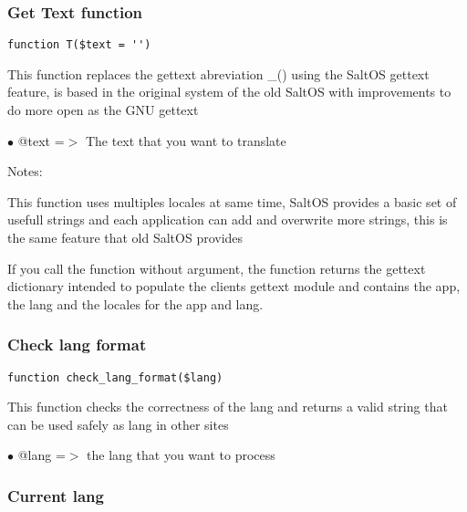 \documentclass[a4paper]{article}
\begin{document}
\subsubsection{Get Text function}

\begin{lstlisting}
function T($text = '')
\end{lstlisting}

This function replaces the gettext abreviation \_() using the SaltOS gettext
feature, is based in the original system of the old SaltOS with improvements
to do more open as the GNU gettext

\begin{compactitem}
\item[\color{myblue}$\bullet$] @text =$>$ The text that you want to translate
\end{compactitem}

Notes:

This function uses multiples locales at same time, SaltOS provides a basic set of
usefull strings and each application can add and overwrite more strings, this is
the same feature that old SaltOS provides

If you call the function without argument, the function returns the gettext
dictionary intended to populate the clients gettext module and contains the
app, the lang and the locales for the app and lang.

\hypertarget{toc150}{}
\subsubsection{Check lang format}

\begin{lstlisting}
function check_lang_format($lang)
\end{lstlisting}

This function checks the correctness of the lang and returns a valid
string that can be used safely as lang in other sites

\begin{compactitem}
\item[\color{myblue}$\bullet$] @lang =$>$ the lang that you want to process
\end{compactitem}

\hypertarget{toc151}{}
\subsubsection{Current lang}
\end{document}

